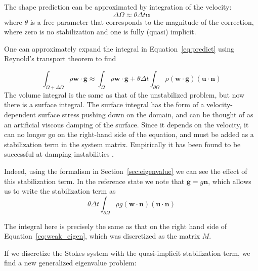 \documentclass[preprint,12pt,authoryear]{elsarticle}
\begin{document}
The shape prediction can be approximated by integration of the velocity:
\begin{equation}
\Delta \Omega \approx \theta \Delta t \mathbf{u}
\end{equation}
where $\theta$ is a free parameter that corresponds to the magnitude of the 
correction, where zero is no stabilization and one is fully (quasi) implicit.

One can approximately expand the integral in Equation~\eqref{eq:predict} using 
Reynold's transport theorem to find

\begin{equation}
\int_{\Omega + \Delta \Omega} \rho  \mathbf{w} \cdot \mathbf{g} \approx
\int_{\Omega} \rho  \mathbf{w} \cdot \mathbf{g} + \theta \Delta t \int_{\partial \Omega} \rho ( \mathbf{w \cdot g}) (\mathbf{u \cdot n} )
\label{eq:kmm}
\end{equation}
The volume integral is the same as that of the unstabilized problem, but now there is a surface integral.
The surface integral has the form of a velocity-dependent surface stress pushing down on the 
domain, and can be thought of as an artificial viscous damping of the surface.
Since it depends on the velocity, it can no longer go on the right-hand side of the 
equation, and must be added as a stabilization term in the system matrix.  
Empirically it has been found to be successful at damping instabilities \citep{kaus2010stabilization, quinquis2011role, crameri2012comparison}.

Indeed, using the formalism in Section~\ref{sec:eigenvalue} we can see the effect of this 
stabilization term. In the reference state we note that $\mathbf{g} = g \mathbf{n}$, which
allows us to write the stabilization term as
\begin{equation}
\theta \Delta t \int_{\partial \Omega} \rho g ( \mathbf{w \cdot n}) (\mathbf{u \cdot n} )
\end{equation}

The integral here is precisely the same as that on the right hand side of Equation~\eqref{eq:weak_eigen}, which was discretized as the matrix $M$.

If we discretize the Stokes system with the quasi-implicit stabilization term, we find
a new generalized eigenvalue problem:
\end{document}
